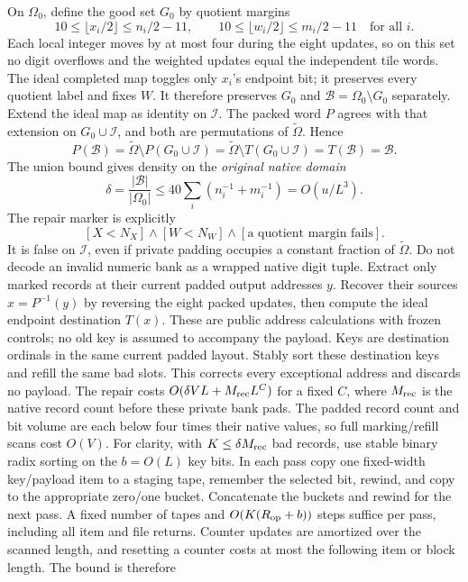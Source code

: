 On $\Omega_0$, define the good set $G_0$ by quotient margins
\[
 10\le\lfloor x_i/2\rfloor\le n_i/2-11,\qquad
 10\le\lfloor w_i/2\rfloor\le m_i/2-11\quad\text{for all }i.
\]
Each local integer moves by at most four during the eight updates, so on
this set no digit overflows and the weighted updates equal the independent
tile words.  The ideal completed map toggles only $x_i$'s endpoint bit;
it preserves every quotient label and fixes $W$.  It therefore preserves
$G_0$ and $\mathcal B=\Omega_0\setminus G_0$ separately.
Extend the ideal map as identity on $\mathcal I$. The packed word
$P$ agrees with that extension on $G_0\cup\mathcal I$, and both
are permutations of $\widetilde\Omega$. Hence
\[
P(\mathcal B)=\widetilde\Omega\setminus P(G_0\cup\mathcal I)
=\widetilde\Omega\setminus T(G_0\cup\mathcal I)=T(\mathcal B)=\mathcal B.
\]
The union bound gives density on the \emph{original native domain}
\[
 \delta=\frac{|\mathcal B|}{|\Omega_0|}
 \le40\sum_i(n_i^{-1}+m_i^{-1})=O(u/L^3).
\]
The repair marker is explicitly
\[
 [X<N_X]\wedge[W<N_W]\wedge[\text{a quotient margin fails}].
\]
It is false on $\mathcal I$, even if private padding occupies a
constant fraction of $\widetilde\Omega$. Do not decode an invalid
numeric bank as a wrapped native digit tuple.
Extract only marked records at their current padded output addresses $y$. Recover
their sources $x=P^{-1}(y)$ by reversing the eight packed updates, then
compute the ideal endpoint destination $T(x)$. These are public address
calculations with frozen controls; no old key is assumed to accompany
the payload. Keys are destination ordinals in the same current padded
layout. Stably sort these destination keys and refill the same bad
slots.  This corrects every exceptional address and discards no payload.
The repair costs $O(\delta VL+M_{\rm rec}L^C)$ for a fixed $C$, where
$M_{\rm rec}$ is the native record count before these private bank
pads. The padded record count and bit volume are each below four
times their native values, so full marking/refill scans cost $O(V)$.
For clarity, with $K\le\delta M_{\rm rec}$ bad records, use stable
binary radix sorting on the $b=O(L)$ key bits. In each pass copy one
fixed-width key/payload item to a staging tape, remember the selected
bit, rewind, and copy to the appropriate zero/one bucket. Concatenate
the buckets and rewind for the next pass. A fixed number of tapes
and $O(K(R_{\rm op}+b))$ steps suffice per pass, including all item
and file returns. Counter updates are amortized over the scanned
length, and resetting a counter costs at most the following item
or block length. The bound is therefore
